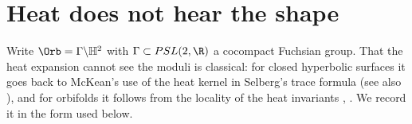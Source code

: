 

\section{Heat does not hear the shape}\label{sec:locality}

Write $\Orb=\Gamma\backslash\mathbb H^2$ with $\Gamma\subset PSL(2,\R)$ a cocompact Fuchsian group. That
the heat expansion cannot see the moduli is classical: for closed hyperbolic surfaces it goes back to
McKean's use of the heat kernel in Selberg's trace formula \cite{mckean1972} (see also
\cite[Ch.~9]{buser1992}), and for orbifolds it follows from the locality of the heat invariants
\cite{donnelly1976}, \cite[Thm~4.8]{dggw2008}. We record it in the form used below.

